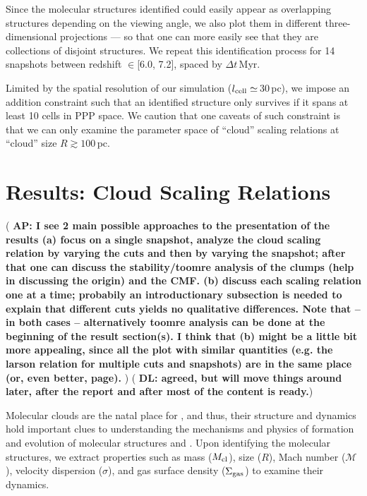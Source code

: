 \documentclass[iop]{emulateapj}
\newcommand{\AP}[1]{({\bf \color{apcolor} AP: #1})}
\newcommand{\DL}[1]{({\bf \color{dlcolor} DL: #1})}
\begin{document}
Since the molecular structures identified could
easily appear as overlapping structures depending on the viewing angle, we
also plot them in different three-dimensional projections --- so that one can more
easily see that they are collections of disjoint structures.
We repeat this identification process for 14 snapshots between
redshift \z$\in$[6.0, 7.2], spaced by $\Delta t$\,Myr.


Limited by the spatial resolution of our simulation ($l_{\rm cell}\simeq$\,30\,pc), we impose an addition constraint such that an identified structure only survives if it spans at least 10 cells in PPP space. We caution that one caveats of such constraint is that we can only examine the parameter space of ``cloud'' scaling relations at ``cloud'' size $R\gtrsim100$\,pc.


\section{Results: Cloud Scaling Relations}     \label{sec:results}

\AP{I see 2 main possible approaches to the presentation of the results
%
(a) focus on a single snapshot, analyze the cloud scaling relation by varying the cuts and then by varying the snapshot; after that one can discuss the stability/toomre analysis of the clumps (help in discussing the origin) and the CMF.
%
(b) discuss each scaling relation one at a time; probabily an introductionary subsection is needed to explain that different cuts yields no qualitative differences.
%
Note that -- in both cases -- alternatively toomre analysis can be done at the beginning of the result section(s).
%
I think that (b) might be a little bit more appealing, since all the plot with similar quantities (e.g. the larson relation for multiple cuts and snapshots) are in the same place (or, even better, page).
}
\DL{agreed, but will move things around later, after the report and after most of the content is ready.}

Molecular clouds are the natal place for \SF, and thus,
their structure and dynamics hold important clues to understanding
the mechanisms and physics of formation and evolution of molecular structures and \SF.
Upon identifying the molecular structures, we extract properties such as
mass ($M_{\rm cl}$),
size ($R$),
Mach number ($\mathcal{M}$), velocity dispersion ($\sigma$), and 
gas surface density ($\Sigma_{\rm gas}$)
to examine their dynamics.
\end{document}
